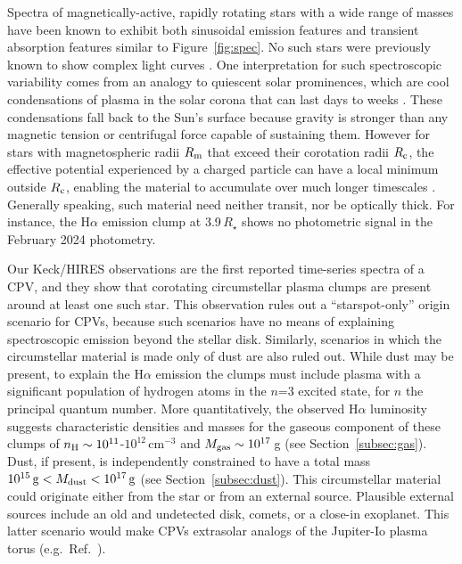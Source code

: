 \documentclass{nature3}
\begin{document}
Spectra of magnetically-active, rapidly rotating stars with a wide range
of masses have been known to exhibit both sinusoidal emission features
\cite{Donati2000,Townsend2005,Dunstone2006,Skelly2008} and
transient absorption features
\cite{CollierCameron1989,CollierCameron1992,Cang2020} similar to
Figure~\ref{fig:spec}.  No such stars were previously known to show
complex light curves \cite{Bouma2024}.   One interpretation for
such spectroscopic variability comes from an analogy to quiescent solar
prominences, which are cool condensations of plasma in the solar corona
that can last days to weeks \cite{VialEngvold2015}.  These
condensations fall back to the Sun's surface because gravity is
stronger than any magnetic tension or centrifugal force capable of
sustaining them.  However for stars with magnetospheric radii $R_{\rm
m}$ that exceed their corotation radii $R_{\rm c}$, the effective
potential experienced by a charged particle can have a local minimum
outside $R_{\rm c}$, enabling the material to accumulate over much
longer timescales \cite{Petit2013,Daley-Yates2024}.  Generally
speaking, such material need neither transit, nor be optically thick.
For instance, the H$\alpha$ emission clump at 3.9\,$R_\star$ shows no 
photometric signal in the February 2024 photometry.

Our Keck/HIRES observations are the first reported time-series spectra
of a CPV, and they show that corotating circumstellar plasma clumps
are present around at least one such star.  This observation rules out
a ``starspot-only'' origin scenario for CPVs, \cite{Koen2021} because
such scenarios have no means of explaining spectroscopic emission
beyond the stellar disk.  Similarly, scenarios in which the
circumstellar material is made only of dust are also ruled out.  While
dust may be present, to explain the H$\alpha$ emission the clumps must
include plasma with a significant population of hydrogen atoms in the
$n$=3 excited state, for $n$ the principal quantum number.  More quantitatively, the observed H$\alpha$
luminosity suggests characteristic densities and masses for the
gaseous component of these clumps of $n_{\rm H} \sim
10^{11}$-$10^{12}$\,cm$^{-3}$ and $M_{\rm gas} \sim 10^{17}$\,g (see
Section~\ref{subsec:gas}).  Dust, if present, is independently
constrained to have a total mass $10^{15}\,{\rm g} < M_{\rm dust} <
10^{17}\,{\rm g}$ (see Section~\ref{subsec:dust}).  This circumstellar
material could originate either from the star or from an external
source.  Plausible external sources include an old and undetected
disk, comets, or a close-in exoplanet.
This latter scenario would make CPVs extrasolar analogs of the
Jupiter-Io plasma torus (e.g.~Ref.~\cite{Bagenal1981}).
\end{document}
